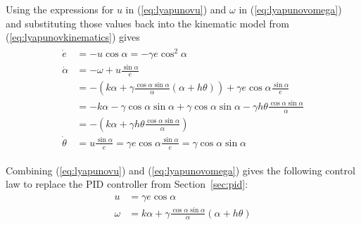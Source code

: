 Using the expressions for $u$ in (\ref{eq:lyapunovu}) and $\omega$ in (\ref{eq:lyapunovomega}) and substituting those values back into the kinematic model from (\ref{eq:lyapunovkinematics}) gives
\begin{align}
\label{eq:lyapunovfinalkinematics}
\begin{split}
\dot{e} &= -u\cos\alpha = -\gamma e\cos^2\alpha \\
\dot{\alpha} &= -\omega + u\frac{\sin\alpha}{e} \\
&= -(k\alpha+\gamma\frac{\cos\alpha\sin\alpha}{\alpha}(\alpha+h\theta))+\gamma e\cos\alpha\frac{\sin\alpha}{e} \\
&= -k\alpha-\gamma\cos\alpha\sin\alpha+\gamma\cos\alpha\sin\alpha-\gamma h\theta\frac{\cos\alpha\sin\alpha}{\alpha} \\
&= -\left(k\alpha + \gamma h\theta\frac{\cos\alpha\sin\alpha}{\alpha}\right) \\
\dot{\theta} &= u\frac{\sin\alpha}{e} = \gamma e\cos\alpha\frac{\sin\alpha}{e} = \gamma\cos\alpha\sin\alpha
\end{split}
\end{align}

Combining (\ref{eq:lyapunovu}) and (\ref{eq:lyapunovomega}) gives the following control law to replace the PID controller from Section~\ref{sec:pid}:
\begin{align}
\label{eq:lyapunovControlLaw}
\begin{split}
u &= \gamma e\cos\alpha \\
\omega &= k\alpha + \gamma\frac{\cos\alpha\sin\alpha}{\alpha}\left(\alpha+h\theta\right)
\end{split}
\end{align}

